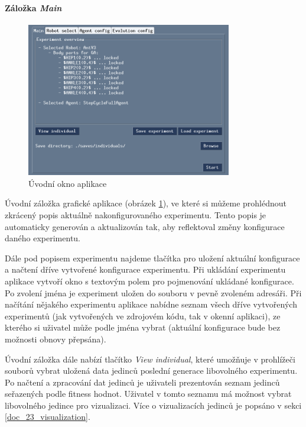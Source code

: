 \paragraph{Záložka \emph{Main}}
\begin{figure}[!htb]
    \centering
    \includegraphics[width=0.8\textwidth]{../img/GUI_main_tab.jpg}
    \caption{Úvodní okno aplikace}
    \label{doc_12_fig:GUI_main}
\end{figure}
Úvodní záložka grafické aplikace (obrázek \ref{doc_12_fig:GUI_main}), ve které
si můžeme prohlédnout zkrácený popis aktuálně nakonfigurovaného experimentu.
Tento popis je automaticky generován a aktualizován tak, aby reflektoval změny
konfigurace daného experimentu. 

Dále pod popisem experimentu najdeme tlačítka pro uložení aktuální konfigurace
a načtení dříve vytvořené konfigurace experimentu. Při ukládání experimentu
aplikace vytvoří okno s textovým polem pro pojmenování ukládané konfigurace. Po
zvolení jména je experiment uložen do souboru v pevně zvoleném adresáři. Při
načítání nějakého experimentu aplikace nabídne seznam všech dříve vytvořených
experimentů (jak vytvořených ve zdrojovém kódu, tak v okenní aplikaci), ze
kterého si uživatel může podle jména vybrat (aktuální konfigurace bude bez
možnosti obnovy přepsána).

Úvodní záložka dále nabízí tlačítko \emph{View individual}, které umožňuje v
prohlížeči souborů vybrat uložená data jedinců poslední generace libovolného
experimentu. Po načtení a zpracování dat jedinců je uživateli prezentován
seznam jedinců seřazených podle fitness hodnot. Uživatel v tomto seznamu má
možnost vybrat libovolného jedince pro vizualizaci. Více o vizualizacích
jedinců je popsáno v sekci \ref{doc_23_visualization}.

